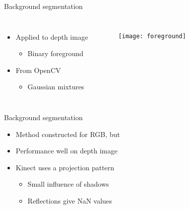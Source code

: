 
\begin{frame}{Background segmentation}

\begin{columns}
	\begin{itemize}


	\item Applied to depth image
	\begin{itemize}
	\item Binary foreground
    \end{itemize}
    	\item From OpenCV
	\begin{itemize}
	\item Gaussian mixtures
	\end{itemize}
	\end{itemize}
	
	\begin{figure}[H]
	\begin{center}
	\texttt{[image: foreground]}
	\end{center}
	\end{figure}
	\end{columns}
\end{frame}
\begin{frame}{Background segmentation}

\begin{itemize}
	\item Method constructed for RGB, but
	\item Performance well on depth image
	\item Kinect uses a projection pattern
	\begin{itemize}
		\item Small influence of shadows
		\item Reflections give NaN values
	\end{itemize}
	\end{itemize}
\end{frame}